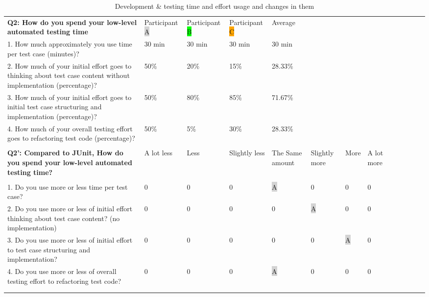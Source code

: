 \begin{table}[H]
{\begin{tabular}{p{13.0cm}*{7}{p{2cm}}}
            \textbf{Q2: How do you spend your low-level automated testing time} & Participant {\colorbox{lightgray}A} & Participant {\colorbox{lime}B} & Participant {\colorbox{orange}C} & Average & & \
            & & & & & & & \\
            1. How much approximately you use time per test case (minutes)? & 30 min & 30 min & 30 min & 30 min \\
            2. How much of your initial effort goes to thinking about test case content without implementation (percentage)? & 50\% & 20\% & 15\% & 28.33\% \\
            3. How much of your initial effort goes to initial test case structuring and implementation (percentage)? & 50\% & 80\% & 85\% & 71.67\% \\
            4. How much of your overall testing effort goes to refactoring test code (percentage)? & 50\% & 5\% & 30\% & 28.33\% \\
            & \\ \hline
            \textbf{Q2': Compared to JUnit, How do you spend your low-level automated testing time?} & A lot less & Less & Slightly less & The Same amount & Slightly more & More & A lot more \\
            & \\
            1. Do you use more or less time per test case? & 0 & 0 & 0 & {\colorbox{lightgray}A} & 0 & 0 & 0 \\
            2. Do you use more or less of initial effort thinking about test case content? (no implementation) & 0 & 0 & 0 & 0 & {\colorbox{lightgray}A} & 0 & 0 \\
            3. Do you use more or less of initial effort to test case structuring and implementation? & 0 & 0 & 0 & 0 & 0 & {\colorbox{lightgray}A} & 0 \\
            4. Do you use more or less of overall testing effort to refactoring test code? & 0 & 0 & 0 & {\colorbox{lightgray}A} & 0 & 0 & 0 \\
            & \\ \topline

            \end{tabular}}
            \caption {Development \& testing time and effort usage and changes in them} \label{tab:changes-pt1}
    \end{table}

